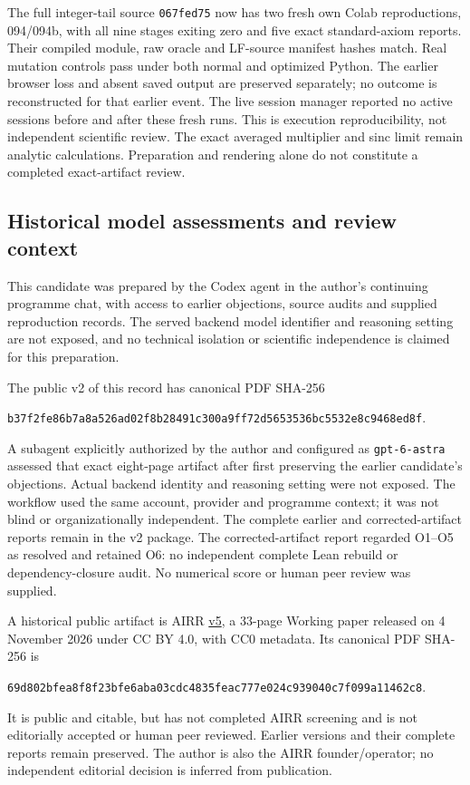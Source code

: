 \documentclass[11pt]{article}
\begin{document}
The full integer-tail source \texttt{067fed75} now has two fresh own Colab
reproductions, 094/094b, with all nine stages exiting zero and five exact
standard-axiom reports. Their compiled module, raw oracle and LF-source
manifest hashes match. Real mutation controls pass under both normal and
optimized Python. The earlier browser loss and absent saved output are
preserved separately; no outcome is reconstructed for that earlier event.
The live session manager reported no active sessions before and after these
fresh runs. This is execution reproducibility, not independent scientific
review. The exact averaged multiplier and sinc limit remain analytic
calculations. Preparation and rendering alone do not constitute a completed
exact-artifact review.
\bigskip
\subsection*{Historical model assessments and review context}
This candidate was prepared by the Codex agent in the author's continuing
programme chat, with access to earlier objections, source audits and supplied
reproduction records. The served backend model identifier and reasoning
setting are not exposed, and no technical isolation or scientific independence
is claimed for this preparation.

The public v2 of this record has canonical PDF SHA-256
\begin{center}\small\texttt{b37f2fe86b7a8a526ad02f8b28491c300a9ff72d5653536bc5532e8c9468ed8f}.\end{center}
A subagent explicitly authorized by the author and configured as
\texttt{gpt-6-astra} assessed that exact eight-page artifact after first
preserving the earlier candidate's objections. Actual backend identity and
reasoning setting were not exposed. The workflow used the same account,
provider and programme context; it was not blind or organizationally
independent. The complete earlier and corrected-artifact reports remain in
the v2 package. The corrected-artifact report regarded O1--O5 as resolved
and retained O6: no independent complete Lean rebuild or dependency-closure
audit. No numerical score or human peer review was supplied.

A historical public artifact is AIRR
\href{https://airr.science/papers/ARR-2026-7EPM3V3DP796BBRR/versions/v5/}{v5},
a 33-page Working paper released on 4 November 2026 under CC BY 4.0,
with CC0 metadata. Its canonical PDF SHA-256 is
\begin{center}\small\texttt{69d802bfea8f8f23bfe6aba03cdc4835feac777e024c939040c7f099a11462c8}.\end{center}
It is public and citable, but has not completed AIRR screening and is not
editorially accepted or human peer reviewed. Earlier versions and their complete
reports remain preserved. The author is also the AIRR founder/operator; no
independent editorial decision is inferred from publication.
\end{document}
